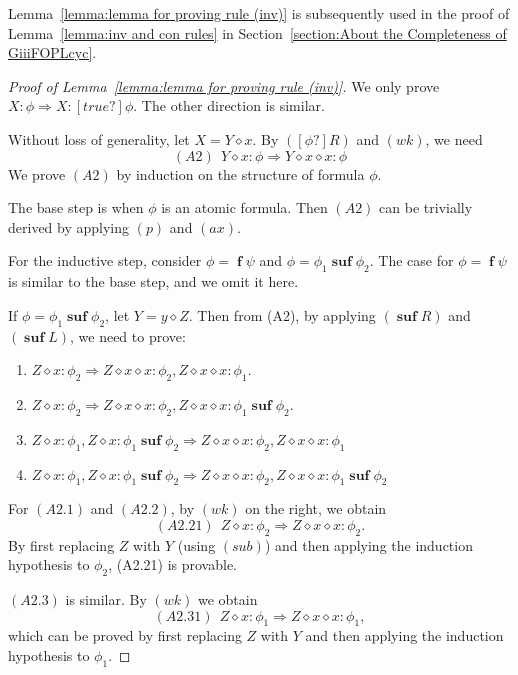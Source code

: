 \documentclass[manuscript,screen]{acmart}
\newcommand{\true}[0]{\mathit{true}}
\newcommand{\Sub}[0]{{\textit{sub}}}
\newcommand{\cat}[0]{\diamond}
\DeclareMathOperator{\ofst}{\mathbf{f}}
\DeclareMathOperator{\osuf}{\mathbf{suf}}
\begin{document}
Lemma~\ref{lemma:lemma for proving rule (inv)} is subsequently used in the proof of Lemma~\ref{lemma:inv and con rules} in Section~\ref{section:About the Completeness of GiiiFOPLcyc}. 

\begin{proof}[Proof of Lemma~\ref{lemma:lemma for proving rule (inv)}]
    We only prove $X: \phi\Rightarrow X : [\true?]\phi$. 
    The other direction is similar. 

Without loss of generality, let $X = Y\cat x$. 
By $([\phi?]R)$ and $(wk)$, we need
$$
(A2)\ \ Y\cat x : \phi\Rightarrow Y \cat x\cat x : \phi
$$
We prove $(A2)$ by induction on the structure of formula $\phi$. 

The base step is when $\phi$ is an atomic formula. Then $(A2)$ can be trivially derived by applying $(p)$ and $(ax)$. 

For the inductive step, consider $\phi = \ofst \psi$ and $\phi = \phi_1\osuf \phi_2$. 
The case for $\phi = \ofst \psi$ is similar to the base step, and we omit it here. 

If $\phi = \phi_1\osuf\phi_2$, let $Y = y\cat Z$. Then from (A2), by applying $(\osuf R)$ and $(\osuf L)$, %
we need to prove: 
\begin{enumerate}
\item[(A2.1)] $Z\cat x : \phi_2\Rightarrow Z\cat x\cat x : \phi_2, Z\cat x\cat x : \phi_1$.
\item[(A2.2)] $Z\cat x : \phi_2\Rightarrow Z\cat x\cat x : \phi_2, Z\cat x\cat x : \phi_1\osuf \phi_2$.
\item[(A2.3)] $Z\cat x : \phi_1, Z\cat x : \phi_1\osuf \phi_2\Rightarrow Z\cat x\cat x : \phi_2, Z\cat x\cat x : \phi_1$
\item[(A2.4)] $Z\cat x : \phi_1, Z\cat x : \phi_1\osuf \phi_2\Rightarrow Z\cat x\cat x : \phi_2, Z\cat x\cat x : \phi_1\osuf \phi_2$
\end{enumerate}
For $(A2.1)$ and $(A2.2)$, by $(wk)$ on the right, we obtain
    $$
    (A2.21)\ \ Z\cat x : \phi_2\Rightarrow Z\cat x\cat x : \phi_2.
    $$
By first replacing $Z$ with $Y$ (using $(\Sub)$) and then applying the induction hypothesis to $\phi_2$, (A2.21) is provable. 

$(A2.3)$ is similar. By $(wk)$ we obtain 
$$
(A2.31)\ \ Z\cat x : \phi_1\Rightarrow Z\cat x\cat x : \phi_1, 
$$
which can be proved by first replacing $Z$ with $Y$ and then applying the induction hypothesis to $\phi_1$. 


\end{proof}
\end{document}
